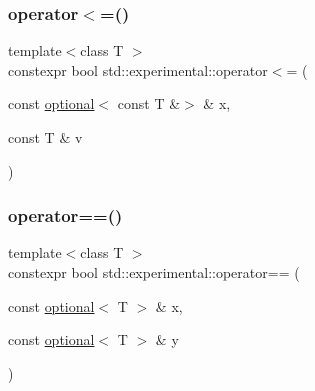\mbox{\label{namespacestd_1_1experimental_afb3a1b869e0a3eb4840f37edf61ba0ef}} 
\subsubsection{\texorpdfstring{operator$<$=()}{operator<=()}\hspace{0.1cm}{\footnotesize\ttfamily [9/9]}}
{\footnotesize\ttfamily template$<$class T $>$ \\
constexpr bool std\+::experimental\+::operator$<$= (\begin{DoxyParamCaption}\item[{const \hyperlink{classstd_1_1experimental_1_1optional}{optional}$<$ const T \&$>$ \&}]{x,  }\item[{const T \&}]{v }\end{DoxyParamCaption})}

\mbox{\label{namespacestd_1_1experimental_a0bd6ca198e90eb70255e0b370072f154}} 
\subsubsection{\texorpdfstring{operator==()}{operator==()}\hspace{0.1cm}{\footnotesize\ttfamily [1/9]}}
{\footnotesize\ttfamily template$<$class T $>$ \\
constexpr bool std\+::experimental\+::operator== (\begin{DoxyParamCaption}\item[{const \hyperlink{classstd_1_1experimental_1_1optional}{optional}$<$ T $>$ \&}]{x,  }\item[{const \hyperlink{classstd_1_1experimental_1_1optional}{optional}$<$ T $>$ \&}]{y }\end{DoxyParamCaption})}

\mbox{\label{namespacestd_1_1experimental_a4f15144833bc5951b01fbd4b4bfdb6fb}} 
